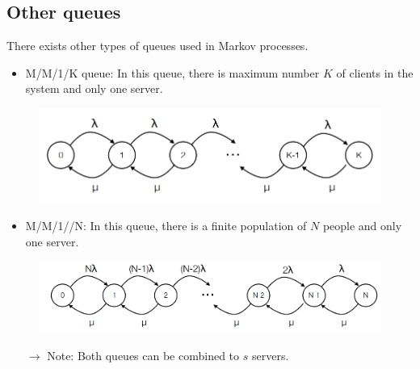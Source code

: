 \documentclass[12pt, openany]{report}
\theoremstyle{definition}
\begin{document}
\subsection{Other queues}
There exists other types of queues used in Markov processes. 
\begin{itemize}
	\item M/M/1/K queue: In this queue, there is maximum number $K$ of clients in the system and only one server.
\end{itemize}
\begin{figure}[H]
	\centering
	\includegraphics[width=.8\textwidth]{img/mm1k.png}
\end{figure}
\begin{itemize}
	\item M/M/1//N: In this queue, there is a finite population of $N$ people and only one server.
\end{itemize}
\begin{figure}[H]
	\centering 
	\includegraphics[width=.8\textwidth]{img/mm1n.png}
\end{figure}
\begin{itemize}
	\item [$\to$] Note: Both queues can be combined to $s$ servers.
\end{itemize}
\end{document}
